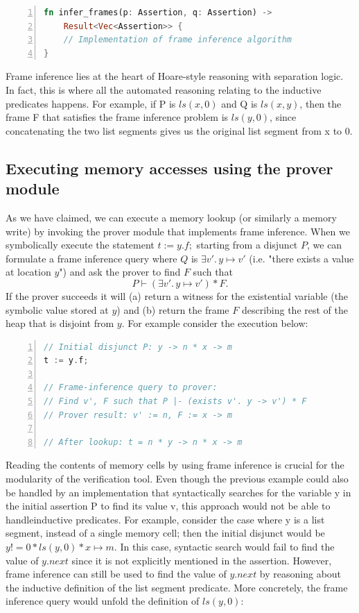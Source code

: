 \documentclass{article}
\begin{document}
\begin{lstlisting}[language=Rust, numbers=left, xleftmargin=.5cm]
fn infer_frames(p: Assertion, q: Assertion) ->
    Result<Vec<Assertion>> {
    // Implementation of frame inference algorithm
}
\end{lstlisting}

Frame inference lies at the heart of Hoare-style reasoning with separation logic.
In fact, this is where all the automated reasoning relating to the inductive predicates happens.
For example, if P is $ls(x, 0)$ and Q is $ls(x, y)$, then the frame F that satisfies the frame inference problem is $ls(y, 0)$, since concatenating the two list segments gives us the original list segment from x to 0.

\subsection{Executing memory accesses using the prover module}

As we have claimed, we can execute a memory lookup (or similarly a memory write) by invoking the prover module that implements frame inference.
When we symbolically execute the statement $t := y.f;$ starting from a disjunct $P$, we can formulate a frame inference query where $Q$ is $\exists v'.\, y \mapsto v'$ (i.e. "there exists a value at location $y$") and ask the prover to find $F$ such that
$$ P \vdash (\exists v'.\, y \mapsto v') * F. $$
If the prover succeeds it will (a) return a witness for the existential variable (the symbolic value stored at $y$) and (b) return the frame $F$ describing the rest of the heap that is disjoint from $y$.
For example consider the execution below:

\begin{lstlisting}[language=C, numbers=left, xleftmargin=.5cm]
// Initial disjunct P: y -> n * x -> m
t := y.f;

// Frame-inference query to prover:
// Find v', F such that P |- (exists v'. y -> v') * F
// Prover result: v' := n, F := x -> m

// After lookup: t = n * y -> n * x -> m
\end{lstlisting}

Reading the contents of memory cells by using frame inference is crucial for the modularity of the verification tool.
Even though the previous example could also be handled by an implementation that syntactically searches for the variable y in the initial assertion P to find its value v, this approach would not be able to handleinductive predicates.
For example, consider the case where y is a list segment, instead of a single memory cell; then the initial disjunct would be $y!=0 * ls(y, 0) * x \mapsto m$.
In this case, syntactic search would fail to find the value of $y.next$ since it is not explicitly mentioned in the assertion.
However, frame inference can still be used to find the value of $y.next$ by reasoning about the inductive definition of the list segment predicate.
More concretely, the frame inference query would unfold the definition of $ls(y, 0)$:
\end{document}
